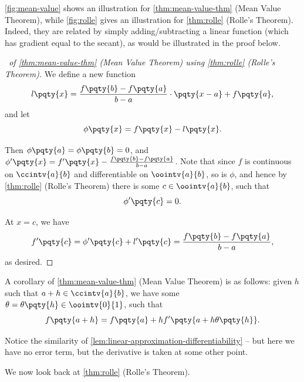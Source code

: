 \autoref{fig:mean-value} shows an illustration for \autoref{thm:mean-value-thm} (Mean Value Theorem), while \autoref{fig:rolle} gives an illustration for \autoref{thm:rolle} (Rolle's Theorem). Indeed, they are related by simply adding/subtracting a linear function (which has gradient equal to the secant), as would be illustrated in the proof below.

\begin{proof}[\proofname\ of \autoref{thm:mean-value-thm} (Mean Value Theorem) using \autoref{thm:rolle} (Rolle's Theorem)]
    We define a new function
    \[
        l\pqty{x} = \frac{f\pqty{b} - f\pqty{a}}{b - a} \cdot \pqty{x - a} + f\pqty{a},
    \]
    and let
    \[
        \phi\pqty{x} = f\pqty{x} - l\pqty{x}.
    \]

    Then \(\phi\pqty{a} = \phi\pqty{b} = 0\), and \(\phi'\pqty{x} = f'\pqty{x} - \frac{f\pqty{b} - f\pqty{a}}{b - a}\). Note that since \(f\) is continuous on \(\ccintv{a}{b}\) and differentiable on \(\oointv{a}{b}\), so is \(\phi\), and hence by \autoref{thm:rolle} (Rolle's Theorem) there is some \(c \in \oointv{a}{b}\), such that
    \[
        \phi'\pqty{c} = 0.
    \]

    At \(x = c\), we have
    \[
        f'\pqty{c} = \phi'\pqty{c} + l'\pqty{c} = \frac{f\pqty{b} - f\pqty{a}}{b - a},
    \]
    as desired.
\end{proof}

\begin{remark}
    A corollary of \autoref{thm:mean-value-thm} (Mean Value Theorem) is as follows: given \(h\) such that \(a + h \in \ccintv{a}{b}\), we have some \(\theta = \theta\pqty{h} \in \oointv{0}{1}\), such that
    \[
        f\pqty{a + h} = f\pqty{a} + h f'\pqty{a + h \theta \pqty{h}}.
    \]

    Notice the similarity of \autoref{lem:linear-approximation-differentiability} -- but here we have no error term, but the derivative is taken at some other point.
\end{remark}

We now look back at \autoref{thm:rolle} (Rolle's Theorem).

